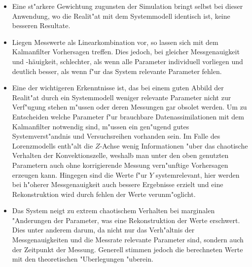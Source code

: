 \begin{refsection}
\begin{itemize}
\item
Eine st"arkere Gewichtung zugunsten der Simulation bringt selbst bei dieser Anwendung, wo die Realit"at mit dem Systemmodell identisch ist, keine besseren Resultate. 

\item
Liegen Messwerte als Linearkombination vor, so lassen sich mit dem Kalmanfilter Vorhersagen treffen. Dies jedoch, bei gleicher Messgenauigkeit und -häuigkeit, schlechter, als wenn alle Parameter individuell vorliegen und deutlich besser, als wenn f"ur das System relevante Parameter fehlen.

\item
Eine der wichtigeren Erkenntnisse ist, das bei einem guten Abbild der Realit"at durch ein Systemmodell weniger relevante Parameter nicht zur Verf"ugung stehen m"ussen oder deren Messungen gar obsolet werden. Um zu Entscheiden welche Parameter f"ur brauchbare Datenassimilationen mit dem Kalmanfilter notwendig sind, m"ussen ein gen"ugend gutes Systemverst"andnis und Versuchsreihen vorhanden sein. Im Falle des Lorenzmodells enth"alt die $Z$-Achse wenig Informationen "uber das chaotische Verhalten der Konvektionszelle, weshalb man unter den oben genutzten Parametern auch ohne korrigierende Messung vern"unftige Vorhersagen erzeugen kann. Hingegen sind die Werte f"ur $Y$ systemrelevant, hier werden bei h"oherer Messgenauigkeit auch bessere Ergebnisse erzielt und eine Rekonstruktion wird durch fehlen der Werte verunm"oglicht.

\item
Das System neigt zu extrem chaotischem Verhalten bei marginalen "Anderungen der Parameter, was eine Rekonstruktion der Werte erschwert. Dies unter anderem darum, da nicht nur das Verh"altnis der Messgenauigkeiten und die Messrate relevante Parameter sind, sondern auch der Zeitpunkt der Messung. Generell stimmen jedoch die berechneten Werte mit den theoretischen "Uberlegungen "uberein.

\end{itemize}

\printbibliography[heading=subbibliography]
\end{refsection}
